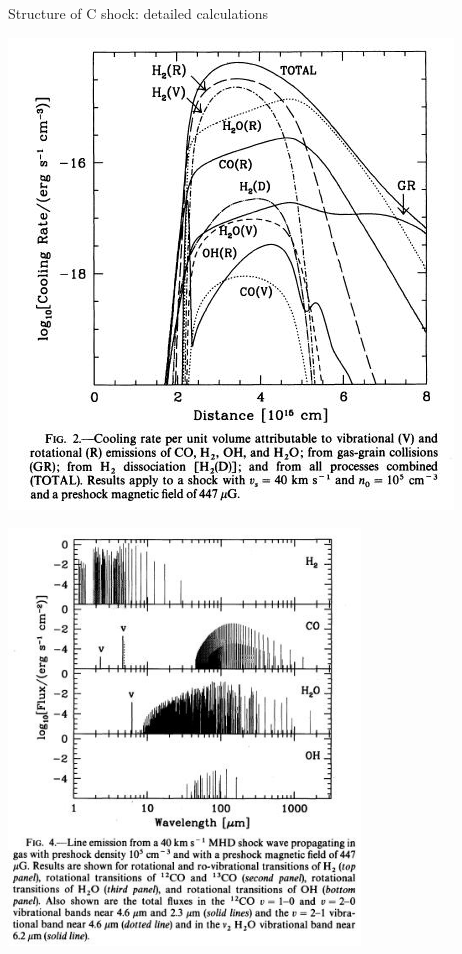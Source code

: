 \begin{frame}{Structure of C shock:  detailed calculations}
\begin{minipage}[t]{0.49\textwidth}
\begin{center}
    \includegraphics[width=\textwidth,height=!]{./E/Fig2_Kaufman_Neufeld.jpg}
    \end{center}
\end{minipage}

\end{frame}



\begin{frame}{}


\begin{center}
\includegraphics[width=0.7\textwidth,height=!]{./E/Fig_4_Kaufman_Neufeld.jpg}
\end{center}

\end{frame}


